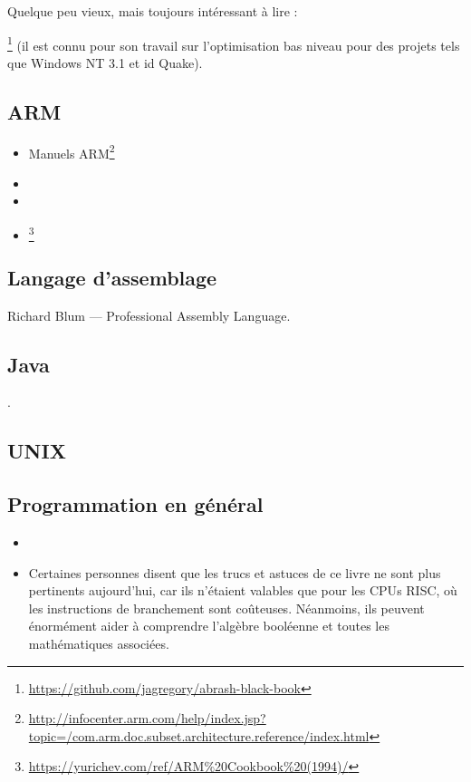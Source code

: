 Quelque peu vieux, mais toujours intéressant à lire :

\MAbrash\footnote{\AlsoAvailableAs \url{https://github.com/jagregory/abrash-black-book}}
(il est connu pour son travail sur l'optimisation bas niveau pour des projets tels que Windows NT 3.1 et id Quake).

\subsection{ARM}

\begin{itemize}
\item Manuels ARM\footnote{\AlsoAvailableAs \url{http://infocenter.arm.com/help/index.jsp?topic=/com.arm.doc.subset.architecture.reference/index.html}}

\item \ARMSevenRef

\item \ARMSixFourRefURL

\item \ARMCookBook\footnote{\AlsoAvailableAs \url{https://yurichev.com/ref/ARM%20Cookbook%20(1994)/}}
\end{itemize}

\subsection{Langage d'assemblage}

Richard Blum --- Professional Assembly Language.

\subsection{Java}

\JavaBook.

\subsection{UNIX}

\TAOUP

\subsection{Programmation en général}

\begin{itemize}

\item \RobPikePractice

\item \HenryWarren
Certaines personnes disent que les trucs et astuces de ce livre ne sont plus pertinents
aujourd'hui, car ils n'étaient valables que pour les \ac{CPU}s \ac{RISC}, où les instructions
de branchement sont coûteuses.
Néanmoins, ils peuvent énormément aider à comprendre l'algèbre booléenne et toutes les
mathématiques associées.

\end{itemize}




